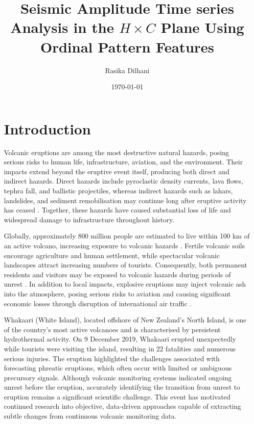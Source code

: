 \documentclass[12pt,a4paper]{article}
\title{Seismic Amplitude Time series Analysis in the $H \times C$ Plane Using Ordinal Pattern Features}
\author{Rasika Dilhani}
\date{\today}
\begin{document}
	
	\maketitle
	
\section{Introduction}

Volcanic eruptions are among the most destructive natural hazards, posing serious risks to human life, infrastructure, aviation, and the environment. Their impacts extend beyond the eruptive event itself, producing both direct and indirect hazards. Direct hazards include pyroclastic density currents, lava flows, tephra fall, and ballistic projectiles, whereas indirect hazards such as lahars, landslides, and sediment remobilisation may continue long after eruptive activity has ceased \cite{Tilling1989}. Together, these hazards have caused substantial loss of life and widespread damage to infrastructure throughout history.

Globally, approximately 800 million people are estimated to live within 100 km of an active volcano, increasing exposure to volcanic hazards \cite{Brown2015}. Fertile volcanic soils encourage agriculture and human settlement, while spectacular volcanic landscapes attract increasing numbers of tourists. Consequently, both permanent residents and visitors may be exposed to volcanic hazards during periods of unrest \cite{Small2001,Auker2013,Erfurt2022}. In addition to local impacts, explosive eruptions may inject volcanic ash into the atmosphere, posing serious risks to aviation and causing significant economic losses through disruption of international air traffic \cite{Prata2009,Tilling1989}.

Whakaari (White Island), located offshore of New Zealand's North Island, is one of the country's most active volcanoes and is characterised by persistent hydrothermal activity. On 9 December 2019, Whakaari erupted unexpectedly while tourists were visiting the island, resulting in 22 fatalities and numerous serious injuries. The eruption highlighted the challenges associated with forecasting phreatic eruptions, which often occur with limited or ambiguous precursory signals. Although volcanic monitoring systems indicated ongoing unrest before the eruption, accurately identifying the transition from unrest to eruption remains a significant scientific challenge. This event has motivated continued research into objective, data-driven approaches capable of extracting subtle changes from continuous volcanic monitoring data.
\end{document}
